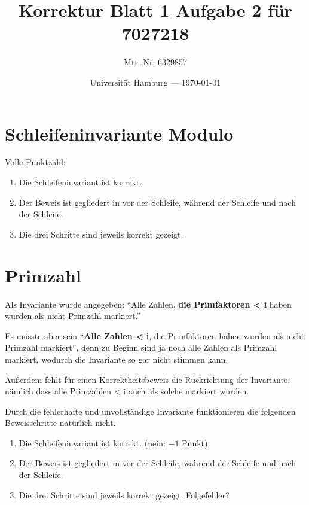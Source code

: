 \documentclass[parskip=half,a4paper]{scrartcl}
\title{Korrektur Blatt 1 Aufgabe 2 für 7027218}
\author{Mtr.-Nr. 6329857}
\date{Universität Hamburg --- \today}
\begin{document}
\maketitle %


\section*{Schleifeninvariante Modulo}

Volle Punktzahl:

\begin{enumerate}
    \item Die Schleifeninvariant ist korrekt. \checkmark
    \item Der Beweis ist gegliedert in vor der Schleife, während der Schleife und nach der Schleife. \checkmark
    \item Die drei Schritte sind jeweils korrekt gezeigt.  \checkmark
\end{enumerate}


\section*{Primzahl}

Als Invariante wurde angegeben: \enquote{Alle Zahlen, \textbf{die Primfaktoren < i} haben wurden als nicht Primzahl markiert.}

Es müsste aber sein \enquote{\textbf{Alle Zahlen < i}, die Primfaktoren haben wurden als nicht Primzahl markiert}, denn zu Beginn sind ja noch alle Zahlen als Primzahl markiert, wodurch die Invariante so gar nicht stimmen kann.

Außerdem fehlt für einen Korrektheitsbeweis die Rückrichtung der Invariante, nämlich dass alle Primzahlen < i auch als solche markiert wurden.

Durch die fehlerhafte und unvollständige Invariante funktionieren die folgenden Beweisschritte natürlich nicht.

\begin{enumerate}
    \item Die Schleifeninvariant ist korrekt. (nein: $-1$ Punkt)
    \item Der Beweis ist gegliedert in vor der Schleife, während der Schleife und nach der Schleife. \checkmark
    \item Die drei Schritte sind jeweils korrekt gezeigt. Folgefehler?
\end{enumerate}
\end{document}
